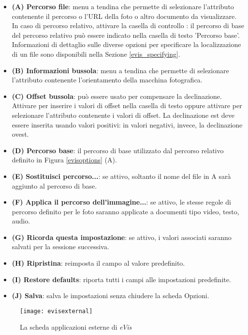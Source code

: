 \begin{itemize}[label=--]
\item \textbf{(A) Percorso file}: menu a tendina che permette di selezionare l'attributo contenente il 
percorso o l'URL della foto o altro documento da visualizzare. 
In caso di percorso relativo, attivare la casella di controllo : 
il percorso di base del percorso relativo può essere indicato nella casella di testo 'Percorso base'.
Informazioni di dettaglio sulle diverse opzioni per specificare la localizzazione di un file sono
disponibili nella Sezione \ref{evis_specifying}.
\item \textbf{(B) Informazioni bussola}: menu a tendina che permette di selezionare l'attributo contenente
l'orientamento della macchina fotografica.
\item \textbf{(C) Offset bussola}: può essere usato per compensare la declinazione. Attivare 
per inserire i valori di offset nella casella di testo oppure attivare  per 
selezionare l'attributo contenente i valori di offset. La declinazione est deve essere inserita usando valori 
positivi: in valori negativi, invece, la declinazione ovest.
\item \textbf{(D) Percorso base}: il percorso di base utilizzato dal percorso relativo definito in Figura \ref{evisoptions} (A).
\item \textbf{(E) Sostituisci percorso...}: se attivo, soltanto il nome del file in A sarà aggiunto al percorso di base. 
\item \textbf{(F) Applica il percorso dell'immagine...}: se attivo, le stesse regole di percorso definito per le foto 
	saranno applicate a documenti tipo video, testo, audio.
\item \textbf{(G) Ricorda questa impostazione}: se attivo, i valori associati saranno salvati per la sessione successiva.
\item \textbf{(H) Ripristina}: reimposta il campo al valore predefinito.
\item \textbf{(I) Restore defaults}: riporta tutti i campi alle impostazioni predefinite.
\item \textbf{(J) Salva}: salva le impostazioni senza chiudere la scheda Opzioni.
\end{itemize}

\label{evis_external_window}

\begin{figure}[htp]
   \centering
   \texttt{[image: evisexternal]}
   \caption{La scheda applicazioni esterne di \emph{eVis} \nixcaption}\label{evisexternal}
\end{figure}

